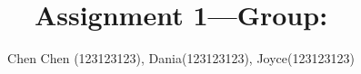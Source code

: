 \documentclass[a5paper,english,12pt]{article}
\title{Assignment 1---Group: }
\author{Chen Chen (123123123), Dania(123123123), Joyce(123123123)}
\begin{document}
\maketitle


\tableofcontents{}
















\end{document}
